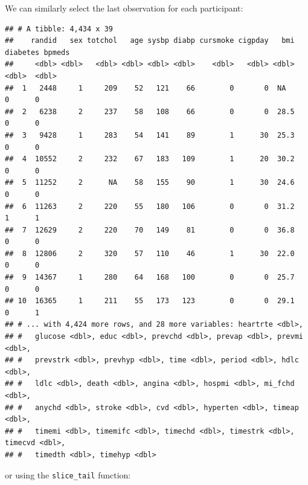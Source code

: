 \documentclass[
]{book}
\newenvironment{Shaded}{\begin{snugshade}}{\end{snugshade}}
\newcommand{\CommentTok}[1]{\textcolor[rgb]{0.56,0.35,0.01}{\textit{#1}}}
\newcommand{\DataTypeTok}[1]{\textcolor[rgb]{0.13,0.29,0.53}{#1}}
\newcommand{\DecValTok}[1]{\textcolor[rgb]{0.00,0.00,0.81}{#1}}
\newcommand{\KeywordTok}[1]{\textcolor[rgb]{0.13,0.29,0.53}{\textbf{#1}}}
\newcommand{\NormalTok}[1]{#1}
\newcommand{\OperatorTok}[1]{\textcolor[rgb]{0.81,0.36,0.00}{\textbf{#1}}}
\newcommand{\StringTok}[1]{\textcolor[rgb]{0.31,0.60,0.02}{#1}}
\begin{document}
We can similarly select the last observation for each participant:

\begin{Shaded}
\end{Shaded}

\begin{verbatim}
## # A tibble: 4,434 x 39
##    randid   sex totchol   age sysbp diabp cursmoke cigpday   bmi diabetes bpmeds
##     <dbl> <dbl>   <dbl> <dbl> <dbl> <dbl>    <dbl>   <dbl> <dbl>    <dbl>  <dbl>
##  1   2448     1     209    52   121    66        0       0  NA          0      0
##  2   6238     2     237    58   108    66        0       0  28.5        0      0
##  3   9428     1     283    54   141    89        1      30  25.3        0      0
##  4  10552     2     232    67   183   109        1      20  30.2        0      0
##  5  11252     2      NA    58   155    90        1      30  24.6        0      0
##  6  11263     2     220    55   180   106        0       0  31.2        1      1
##  7  12629     2     220    70   149    81        0       0  36.8        0      0
##  8  12806     2     320    57   110    46        1      30  22.0        0      0
##  9  14367     1     280    64   168   100        0       0  25.7        0      0
## 10  16365     1     211    55   173   123        0       0  29.1        0      1
## # ... with 4,424 more rows, and 28 more variables: heartrte <dbl>,
## #   glucose <dbl>, educ <dbl>, prevchd <dbl>, prevap <dbl>, prevmi <dbl>,
## #   prevstrk <dbl>, prevhyp <dbl>, time <dbl>, period <dbl>, hdlc <dbl>,
## #   ldlc <dbl>, death <dbl>, angina <dbl>, hospmi <dbl>, mi_fchd <dbl>,
## #   anychd <dbl>, stroke <dbl>, cvd <dbl>, hyperten <dbl>, timeap <dbl>,
## #   timemi <dbl>, timemifc <dbl>, timechd <dbl>, timestrk <dbl>, timecvd <dbl>,
## #   timedth <dbl>, timehyp <dbl>
\end{verbatim}

or using the \texttt{slice\_tail} function:

\begin{Shaded}
\end{Shaded}
\end{document}
